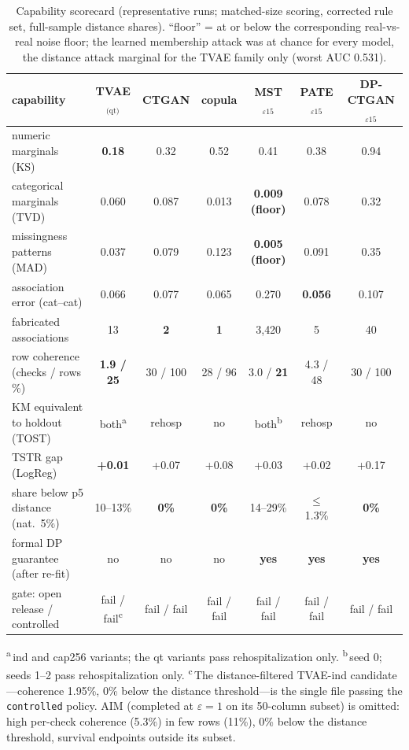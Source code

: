 \documentclass[11pt,a4paper]{article}
\newcommand{\eps}{\ensuremath{\varepsilon}}
\begin{document}
\begin{table}[htbp]
\centering
\small
\caption{Capability scorecard (representative runs; matched-size scoring,
corrected rule set, full-sample distance shares). ``floor'' = at or below the
corresponding real-vs-real noise floor; the learned membership attack was at
chance for every model, the distance attack marginal for the TVAE family only
(worst AUC 0.531).}%
\label{tab:scorecard}
\begin{tabular}{lcccccc}
\toprule
capability & TVAE$_\text{(qt)}$ & CTGAN & copula & MST$_{\eps 15}$ & PATE$_{\eps 15}$ & DP-CTGAN$_{\eps 15}$ \\
\midrule
numeric marginals (KS) & \textbf{0.18} & 0.32 & 0.52 & 0.41 & 0.38 & 0.94 \\
categorical marginals (TVD) & 0.060 & 0.087 & 0.013 & \textbf{0.009 (floor)} & 0.078 & 0.32 \\
missingness patterns (MAD) & 0.037 & 0.079 & 0.123 & \textbf{0.005 (floor)} & 0.091 & 0.35 \\
association error (cat--cat) & 0.066 & 0.077 & 0.065 & 0.270 & \textbf{0.056} & 0.107 \\
fabricated associations & 13 & \textbf{2} & \textbf{1} & 3{,}420 & 5 & 40 \\
row coherence (checks / rows \%) & \textbf{1.9 / 25} & 30 / 100 & 28 / 96 & 3.0 / \textbf{21} & 4.3 / 48 & 30 / 100 \\
KM equivalent to holdout (TOST) & both\textsuperscript{a} & rehosp & no & both\textsuperscript{b} & rehosp & no \\
TSTR gap (LogReg) & \textbf{+0.01} & +0.07 & +0.08 & +0.03 & +0.02 & +0.17 \\
share below p5 distance (nat.\ 5\%) & 10--13\% & \textbf{0\%} & \textbf{0\%} & 14--29\% & $\leq$1.3\% & \textbf{0\%} \\
formal DP guarantee (after re-fit) & no & no & no & \textbf{yes} & \textbf{yes} & \textbf{yes} \\
gate: open release / controlled & fail / fail\textsuperscript{c} & fail / fail & fail / fail & fail / fail & fail / fail & fail / fail \\
\bottomrule
\end{tabular}

\raggedright\footnotesize \textsuperscript{a}\,ind and cap256 variants; the qt
variants pass rehospitalization only. \textsuperscript{b}\,seed 0; seeds 1--2
pass rehospitalization only. \textsuperscript{c}\,The distance-filtered TVAE-ind
candidate---coherence 1.95\%, 0\% below the distance threshold---is the single
file passing the \texttt{controlled} policy. AIM (completed at $\eps{=}1$ on its
50-column subset) is omitted: high per-check coherence (5.3\%) in few rows
(11\%), 0\% below the distance threshold, survival endpoints outside its subset.
\end{table}
\end{document}
